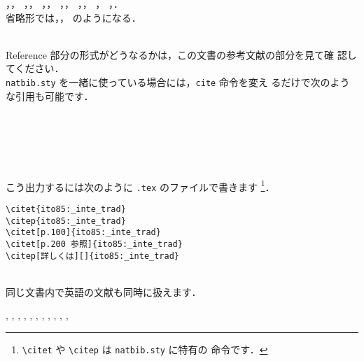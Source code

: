 \documentclass[a4j,10pt]{jarticle}
\begin{document}
\begin{screen}
\cite{miyazawa02:_io_intr}，\cite{isikawa02jp:_env_trade}，
\cite{oyama99:_mark_stru}，\cite{kuroda97jp:keo}，
\cite{kiyono93:_regu_comp_1}，\cite{iwamoto91jp:haito-keika}，
\cite{ito85:_inte_trad}，\cite{nishimura90:_micr_econ}，
\cite{imai72:_micr_2}，\cite{imai71:_micr_1}，
\cite{somusho04jp:2000io-kaisetsu}，
\cite{barro97jp}，\cite{markusen99jp:trade_vol_1}．\\
省略形では，\cite{imai71:_micr_1}，\cite{markusen99jp:trade_vol_1}
のようになる．
\end{screen}
\\

Reference 部分の形式がどうなるかは，この文書の参考文献の部分を見て確
認してください．
\\

\texttt{natbib.sty} を一緒に使っている場合には，\texttt{cite} 命令を変え
るだけで次のような引用も可能です．

\begin{screen}
\hspace*{1cm} \citet{ito85:_inte_trad}\\
\hspace*{1cm} \citep{ito85:_inte_trad}\\
\hspace*{1cm} \citet[p.100]{ito85:_inte_trad}\\
\hspace*{1cm} \citet[p.200 参照]{ito85:_inte_trad}\\
\hspace*{1cm} \citep[詳しくは][]{ito85:_inte_trad}
\end{screen}

こう出力するには次のように \texttt{.tex} のファイルで書きます
\footnote{\verb|\citet| や \verb|\citep| は \texttt{natbib.sty} に特有の
命令です．}．

\begin{screen}
 \begin{verbatim}
\citet{ito85:_inte_trad}
\citep{ito85:_inte_trad}
\citet[p.100]{ito85:_inte_trad}
\citet[p.200 参照]{ito85:_inte_trad}
\citep[詳しくは][]{ito85:_inte_trad}
 \end{verbatim}
\end{screen}
\\

同じ文書内で英語の文献も同時に扱えます．

\begin{screen}
 \citet{ishikawa03:_green_gas_emiss_contr_open_econom},
 \citet{ishikawa94:_revis_stolp_samuel_rybcz_theor_produc_exter},
 \citet{brooke03:_gams},
 \citet{rutherford00:_gtapin_gtap_eg},
 \citet{fujita99jp:_spatial_econom},
 \citet{wong95:_inter_trade_goods_factor_mobil_},
 \citet{brezis93:_leapf_inter_compet},
 \citet{krugman91:_geogr_trade},
 \citet{krugman91:_is_bilat_bad},
 \citet{wang89:_model_therm_hydrod_aspec_molten},
 \citet{lucas76:_econom_polic_evaluat},
 \citet{milne-thomson68:_theor_hydrod}
\end{screen}
\end{document}
